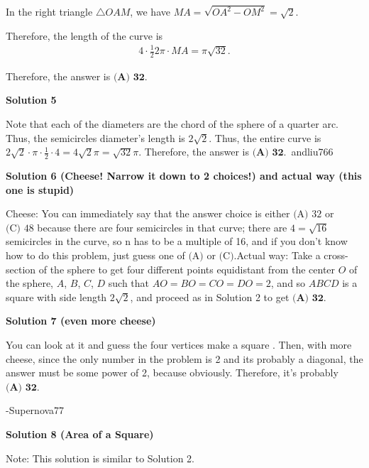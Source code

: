\begin{enumerate}
 In the right triangle $\triangle OAM$, we have $MA = \sqrt{OA^2 - OM^2} = \sqrt{2}$.

 Therefore, the length of the curve is
 \begin{align*} 4 \cdot \frac{1}{2} 2 \pi \cdot MA = \pi \sqrt{32} . \end{align*}


 Therefore, the answer is $\boxed{\textbf{(A) 32}}$.

 



\textbf{Solution 5}

Note that each of the diameters are the chord of the sphere of a quarter arc. Thus, the semicircles diameter's length is $2\sqrt{2}$. Thus, the entire curve is $2\sqrt{2} \cdot \pi \cdot \frac{1}{2} \cdot 4 = 4\sqrt{2} \pi = \sqrt{32} \pi$. Therefore, the answer is $\boxed{\textbf{(A) 32}}$.~andliu766

 



\textbf{Solution 6 (Cheese! Narrow it down to 2 choices!) and actual way (this one is stupid)}

Cheese: You can immediately say that the answer choice is either ${\text{(A) }32}$ or ${\text{(C) }48}$ because there are four semicircles in that curve; there are $4 = \sqrt{16}$ semicircles in the curve, so n has to be a multiple of 16, and if you don't know how to do this problem, just guess one of ${\text{(A)}}$ or ${\text{(C)}}$.Actual way: Take a cross-section of the sphere to get four different points equidistant from the center $O$ of the sphere, $A$, $B$, $C$, $D$ such that $AO = BO = CO = DO = 2$, and so $ABCD$ is a square with side length $2\sqrt{2}$, and proceed as in Solution 2 to get $\boxed{\textbf{(A) 32}}$.       

 



\textbf{Solution 7 (even more cheese)}

You can look at it and guess the four vertices make a square . Then, with more cheese, since the only number in the problem is 2 and its probably a diagonal, the answer must be some power of 2, because obviously. Therefore, it's probably $\boxed{\textbf{(A) 32}}$.

 -Supernova77

 



\textbf{Solution 8 (Area of a Square)}

Note: This solution is similar to Solution 2.


\end{enumerate}
